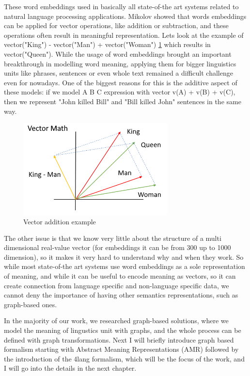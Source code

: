 These word embeddings used in basically all state-of-the art systems related to natural language processing applications. Mikolov \cite{Mikolov:2013c} showed that words embeddings can be applied for vector operations, like addition or subtraction, and these operations often result in meaningful representation. Lets look at the example of vector("King") - vector("Man") + vector("Woman") \ref{fig:vecs} which results in vector("Queen"). While the usage of word embeddings brought an important breakthrough in modelling word meaning, applying them for bigger linguistics units like phrases, sentences or even whole text remained a difficult challenge even for nowadays. One of the biggest reasons for this is the additive aspect of these models: if we model A B C expression with vector v(A) + v(B) + v(C), then we represent "John killed Bill" and "Bill killed John" sentences in the same way. 

\begin{figure}[h]
	\centering
	\includegraphics[width=0.7\textwidth]{figures/vecs}
	\caption{Vector addition example}
	\label{fig:vecs}
\end{figure}

The other issue is that we know very little about the structure of a multi dimensional real-value vector (for embeddings it can be from 300 up to 1000 dimension), so it makes it very hard to understand why and when they work. So while most state-of-the art systems use word embeddings as a sole representation of meaning, and while it can be useful to encode meaning as vectors, so it can create connection from language specific and non-language specific data, we cannot deny the importance of having other semantics representations, such as graph-based ones. 

In the majority of our work, we researched graph-based solutions, where we model the meaning of lingustics unit with graphs, and the whole process can be defined with graph transformations. Next I will briefly introduce graph based formalism starting with Abstract Meaning Representations (AMR) followed by the introduction of the 4lang formalism, which will be the focus of the work, and I will go into the details in the next chapter.

